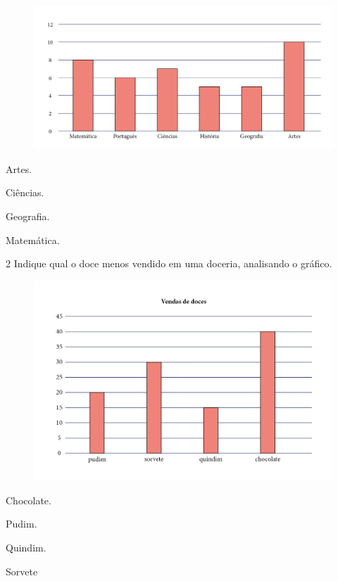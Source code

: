 \begin{figure}[htpb!]
\includegraphics[width=\textwidth]{./media/image100.png}
\end{figure}

\begin{escolha}
\item Artes.

\item Ciências.

\item Geografia.

\item Matemática.
\end{escolha}

\num{2} Indique qual o doce menos vendido em uma doceria, analisando o gráfico.

\begin{figure}[htpb!]
\includegraphics[width=\textwidth]{./media/image101.png}
\end{figure}

\begin{escolha}
\item Chocolate.

\item Pudim.

\item Quindim.

\item Sorvete
\end{escolha}

